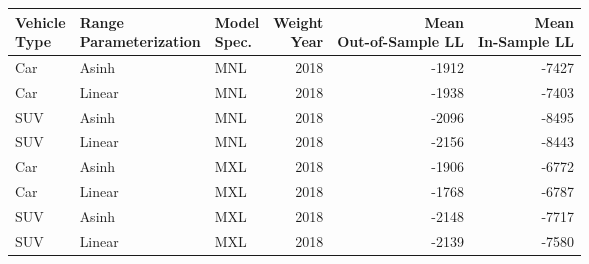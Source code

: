 \begin{tabular}{lllrrr}
\toprule
\makecell{Vehicle\\Type} & \makecell{Range\\Parameterization} & \makecell{Model\\Spec.} &  \makecell{Weight\\Year} &  \makecell{Mean\\Out-of-Sample LL} &  \makecell{Mean\\In-Sample LL} \\
\midrule
                     Car &                              Asinh &                     MNL &                     2018 &                              -1912 &                          -7427 \\
                     Car &                             Linear &                     MNL &                     2018 &                              -1938 &                          -7403 \\
                     SUV &                              Asinh &                     MNL &                     2018 &                              -2096 &                          -8495 \\
                     SUV &                             Linear &                     MNL &                     2018 &                              -2156 &                          -8443 \\
                     Car &                              Asinh &                     MXL &                     2018 &                              -1906 &                          -6772 \\
                     Car &                             Linear &                     MXL &                     2018 &                              -1768 &                          -6787 \\
                     SUV &                              Asinh &                     MXL &                     2018 &                              -2148 &                          -7717 \\
                     SUV &                             Linear &                     MXL &                     2018 &                              -2139 &                          -7580 \\
\bottomrule
\end{tabular}
